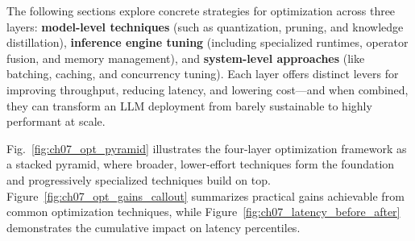 The following sections explore concrete strategies for optimization across three layers: \textbf{model-level techniques} (such as quantization, pruning, and knowledge distillation), \textbf{inference engine tuning} (including specialized runtimes, operator fusion, and memory management), and \textbf{system-level approaches} (like batching, caching, and concurrency tuning). Each layer offers distinct levers for improving throughput, reducing latency, and lowering cost---and when combined, they can transform an LLM deployment from barely sustainable to highly performant at scale.

Fig.~\ref{fig:ch07_opt_pyramid} illustrates the four-layer optimization framework as a stacked pyramid, where broader, lower-effort techniques form the foundation and progressively specialized techniques build on top. Figure~\ref{fig:ch07_opt_gains_callout} summarizes practical gains achievable from common optimization techniques, while Figure~\ref{fig:ch07_latency_before_after} demonstrates the cumulative impact on latency percentiles.

